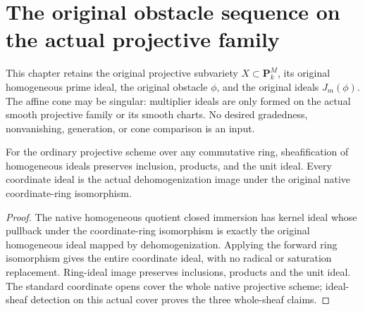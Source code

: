 \chapter{The original obstacle sequence on the actual projective family}
\label{chap:c0n-graded-base-ideals}

This chapter retains the original projective subvariety $X\subset\mathbf P^M_k$,
its original homogeneous prime ideal, the original obstacle $\phi$, and the
original ideals $J_m(\phi)$. The affine cone may be singular: multiplier ideals
are only formed on the actual smooth projective family or its smooth charts.
No desired gradedness, nonvanishing, generation, or cone comparison is an input.

\begin{lemma}
\label{lem:c0n-homogeneous-sheaf-arithmetic}
\leanok
For the ordinary projective scheme over any commutative ring, sheafification of
homogeneous ideals preserves inclusion, products, and the unit ideal. Every
coordinate ideal is the actual dehomogenization image under the original
native coordinate-ring isomorphism.
\end{lemma}
\begin{proof}
The native homogeneous quotient closed immersion has kernel ideal whose
pullback under the coordinate-ring isomorphism is exactly the original
homogeneous ideal mapped by dehomogenization. Applying the forward ring
isomorphism gives the entire coordinate ideal, with no radical or saturation
replacement. Ring-ideal image preserves inclusions, products and the unit
ideal. The standard coordinate opens cover the whole native projective scheme;
ideal-sheaf detection on this actual cover proves the three whole-sheaf claims.
\end{proof}

